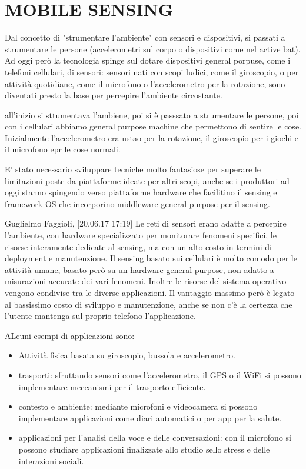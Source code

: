 \documentclass{article}
\begin{document}
\section{MOBILE SENSING}
Dal concetto di "strumentare l'ambiente" con sensori e dispositivi, si passati a strumentare le persone (accelerometri sul corpo o dispositivi come nel active bat). Ad oggi però la tecnologia spinge sul dotare dispositivi general porpuse, come i telefoni cellulari, di sensori: sensori nati con scopi ludici, come il giroscopio, o per attività quotidiane, come il microfono o l'accelerometro per la rotazione, sono diventati presto la base per percepire l'ambiente circostante.

all'inizio si sttumentava l'ambiene, poi si è passsato a strumentare le persone, poi con i cellulari abbiamo general purpose machine che permettono di sentire le cose. Inizialmente l'accelerometro era ustao per la rotazione, il giroscopio per i giochi e il microfono epr le cose normali.

E' stato necessario sviluppare tecniche molto fantasiose per superare le limitazioni poste da piattaforme ideate per altri scopi, anche se i produttori ad oggi stanno spingendo verso piattaforme hardware che facilitino il sensing e framework OS che incorporino middleware general purpose per il sensing.

Guglielmo Faggioli, [20.06.17 17:19]
Le reti di sensori erano adatte a percepire l'ambiente, con hardware specializzato per monitorare fenomeni specifici, le risorse interamente dedicate al sensing, ma con un alto costo in termini di deployment e manutenzione.
Il sensing basato sui cellulari è molto comodo per le attività umane, basato però su un hardware general purpose, non adatto a misurazioni accurate dei vari fenomeni. Inoltre le risorse del sistema operativo vengono condivise tra le diverse applicazioni. Il vantaggio massimo però è legato al bassissimo costo di sviluppo e manutenzione, anche se non c'è la certezza che l'utente mantenga sul proprio telefono l'applicazione.

ALcuni esempi di applicazioni sono:
\begin{itemize}
\item Attività fisica basata su giroscopio, bussola e accelerometro.
\item trasporti: sfruttando sensori come l'accelerometro, il GPS o il WiFi si possono implementare meccanismi per il trasporto efficiente.
\item contesto e ambiente: mediante microfoni e videocamera si possono implementare applicazioni come diari automatici o per app per la salute.
\item applicazioni per l'analisi della voce e delle conversazioni: con il microfono si possono studiare applicazioni finalizzate allo studio sello stress e delle interazioni sociali.
\end{itemize}
\end{document}
